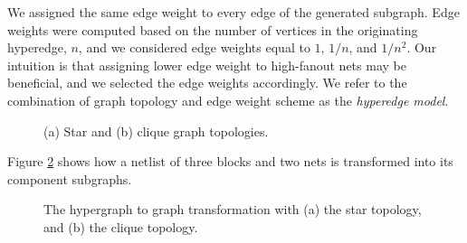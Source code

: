 We assigned the same edge weight to every edge of the generated subgraph. Edge weights were computed based on the number of vertices in the originating hyperedge, $n$, and we considered edge weights equal to $1$, $1/n$, and $1/n^2$.  Our intuition is that assigning lower edge weight to high-fanout nets may be beneficial, and we selected the edge weights accordingly. We refer to the combination of graph topology and edge weight scheme as the \emph{hyperedge model}.

\begin{figure}[!htbp]
\centering
{}
\caption{(a) Star and (b) clique graph topologies.}
\label{fig:star_clique}
\end{figure}



Figure \ref{fig:hyperedge_to_graph} shows how a netlist of three blocks and two nets is transformed into its component subgraphs.

\begin{figure}[!htbp]
\centering
{}
\caption{The hypergraph to graph transformation with (a) the star topology, and (b) the clique topology.}
\label{fig:hyperedge_to_graph}
\end{figure}

